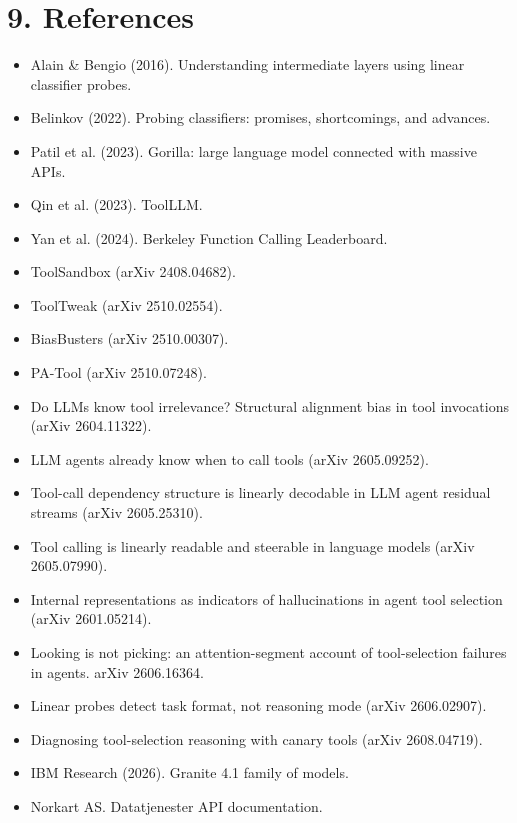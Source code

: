 \documentclass[11pt,a4paper]{article}
\begin{document}
\section*{9. References}

\begin{itemize}
    \item Alain \& Bengio (2016). Understanding intermediate layers using linear classifier probes.
    \item Belinkov (2022). Probing classifiers: promises, shortcomings, and advances.
    \item Patil et al. (2023). Gorilla: large language model connected with massive APIs.
    \item Qin et al. (2023). ToolLLM.
    \item Yan et al. (2024). Berkeley Function Calling Leaderboard.
    \item ToolSandbox (arXiv 2408.04682).
    \item ToolTweak (arXiv 2510.02554).
    \item BiasBusters (arXiv 2510.00307).
    \item PA-Tool (arXiv 2510.07248).
    \item Do LLMs know tool irrelevance? Structural alignment bias in tool invocations (arXiv 2604.11322).
    \item LLM agents already know when to call tools (arXiv 2605.09252).
    \item Tool-call dependency structure is linearly decodable in LLM agent residual streams (arXiv 2605.25310).
    \item Tool calling is linearly readable and steerable in language models (arXiv 2605.07990).
    \item Internal representations as indicators of hallucinations in agent tool selection (arXiv 2601.05214).
    \item Looking is not picking: an attention-segment account of tool-selection failures in agents.
    arXiv 2606.16364.
    \item Linear probes detect task format, not reasoning mode (arXiv 2606.02907).
    \item Diagnosing tool-selection reasoning with canary tools (arXiv 2608.04719).
    \item IBM Research (2026). Granite 4.1 family of models.
    \item Norkart AS. Datatjenester API documentation.
\end{itemize}
\end{document}
